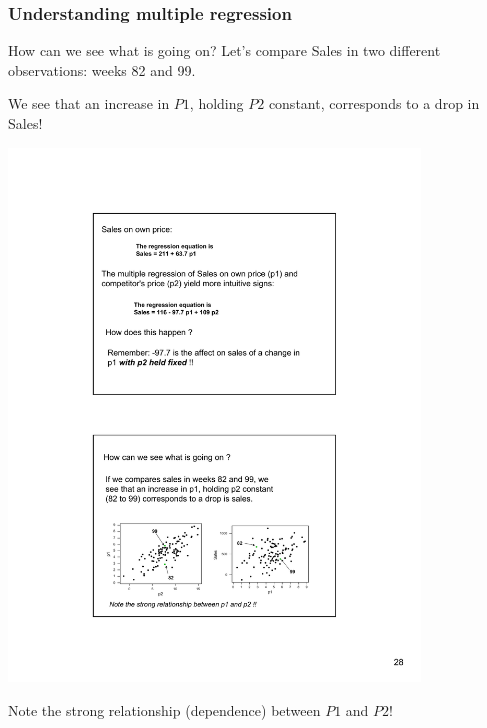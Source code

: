 \documentclass{beamer}
\newcommand{\sk}{\vspace{.5cm}}
\begin{document}
\begin{frame}
\frametitle{Understanding multiple regression}

How can we see what is going on? Let's compare Sales in two different observations: weeks 82 and 99. \sk

We see that an {\color{blue}increase} in $P1$, holding $P2$ {\color{blue}constant}, corresponds to a drop in Sales! 

\vspace{3mm}


\hspace*{0mm}\includegraphics[width=4.3in]{figures/Sales2}




\color{burntorange}Note the strong relationship (dependence) between $P1$ and $P2$!


\end{frame}
\end{document}
